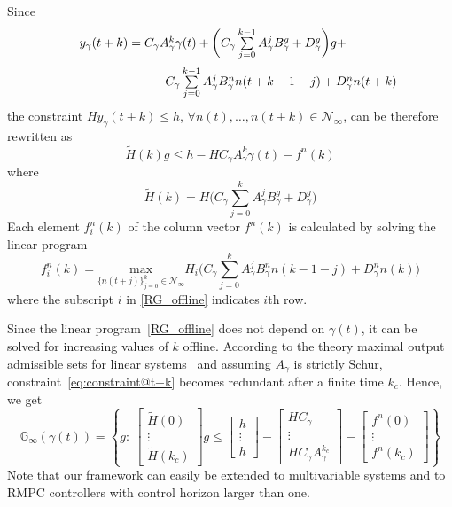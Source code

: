 \documentclass[letterpaper, 10 pt, conference]{ieeeconf}  %
\newcommand{\smallmat}[1]{\left[ \begin{smallmatrix}#1 \end{smallmatrix} \right]}
\begin{document}
Since 
	\begin{equation*}
	\hspace{-30pt}
	\begin{aligned}
	\begin{matrix}
	y_{\gamma}(t+k) = C_{\gamma}A_{\gamma}^{k}\gamma(t) + \bigg( C_{\gamma}\sum\limits_{j=0}^{k-1}A_{\gamma}^{j}B^g_{\gamma} + D_{\gamma}^g \bigg)g + \vspace{5pt}\\  \hspace{110pt} C_{\gamma}\sum\limits_{j=0}^{k-1}A_{\gamma}^jB^n_{\gamma}n(t+k-1-j) + D_{\gamma}^n n(t+k)
	\end{matrix}
	\end{aligned}
	\end{equation*}
the constraint $Hy_\gamma(t+k)\leq h$, $\forall n(t),\ldots,n(t+k)\in \mathcal{N}_{\infty}$,
can be therefore rewritten as
\begin{equation}
    \tilde{H}(k)g \leq  h - HC_{\gamma}A_{\gamma}^k\gamma(t) - f^n(k)
    \label{eq:constraint@t+k}
\end{equation}
where 
\[
\tilde{H}(k) = H\bigg( C_{\gamma}\sum\limits_{j=0}^kA_{\gamma}^{j}B^g_{\gamma} + D_{\gamma}^g \bigg)
\]
Each element $f^n_i(k)$ of the column vector $f^n(k)$ is calculated by solving the linear program
	\begin{equation}
	f_i^n(k) = \underset{\{n(t+j)\}_{j=0}^{k}\in \mathcal{N}_{\infty}}{\text{max}} H_i\bigg(C_{\gamma}\sum\limits_{j=0}^kA_{\gamma}^jB^n_{\gamma}n(k-1-j)
    + D_{\gamma}^n n(k)\bigg)
	\label{RG_offline}
	\end{equation}
where the subscript $i$ in \eqref{RG_offline} indicates $i$th row. 

Since the linear program~\eqref{RG_offline} does not depend on $\gamma(t)$, it can be solved for increasing values of $k$ offline. 
According to the theory maximal output admissible sets for linear systems~\cite{83532}
and assuming $A_\gamma$ is strictly Schur, constraint~\eqref{eq:constraint@t+k} becomes redundant after a finite time $k_c$.
Hence, we get
	 \begin{equation}
\mathbb{G}_{\infty}(\gamma(t))=\left\{g:\ 
\smallmat{\tilde{H}(0)\\\vdots\\
	 \tilde{H}(k_c)}g \leq
	 \smallmat{h\\\vdots\\h}- 
\smallmat{HC_{\gamma}\\\vdots\\
	 HC_{\gamma}A_{\gamma}^{k_c}}- 
\smallmat{ f^n(0)\\\vdots\\ f^n(k_c)}\right\}
	 \label{MOAS}
	 \end{equation}
Note that our framework can easily be extended to multivariable systems
and to RMPC controllers with control horizon larger than one.
	 
\end{document}
